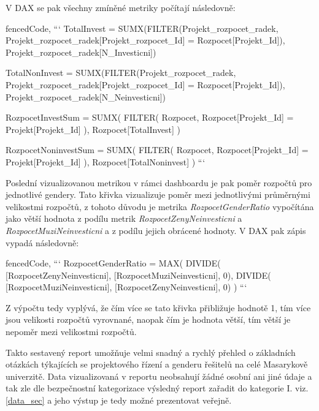 \documentclass[
  digital,     %
  twoside,     %
  lof,         %
  lot,         %
]{fithesis4}
\begin{document}
V DAX se pak všechny zmíněné metriky počítají následovně:
\begin{tcolorbox}
\begin{markdown*}{%
  fencedCode,
}
```
TotalInvest = 
    SUMX(FILTER(Projekt_rozpocet_radek,
         Projekt_rozpocet_radek[Projekt_rozpocet_Id] =
            Rozpocet[Projekt_Id]),
    Projekt_rozpocet_radek[N_Investicni])

TotalNonInvest = 
    SUMX(FILTER(Projekt_rozpocet_radek,
         Projekt_rozpocet_radek[Projekt_rozpocet_Id] =
            Rozpocet[Projekt_Id]),
    Projekt_rozpocet_radek[N_Neinvesticni])


RozpocetInvestSum = 
    SUMX(
        FILTER(
            Rozpocet,
            Rozpocet[Projekt_Id] = Projekt[Projekt_Id]
            ),
        Rozpocet[TotalInvest]
    )

RozpocetNoninvestSum = 
    SUMX(
        FILTER(
            Rozpocet,
            Rozpocet[Projekt_Id] = Projekt[Projekt_Id]
            ),
        Rozpocet[TotalNoninvest]
    )
```
\end{markdown*}
\end{tcolorbox}

Poslední vizualizovanou metrikou v rámci dashboardu je pak poměr rozpočtů pro jednotlivé gendery. Tato křivka vizualizuje poměr mezi jednotlivými průměrnými velikostmi rozpočtů, z tohoto důvodu  je metrika \emph{RozpocetGenderRatio} vypočítána jako větší hodnota z podílu metrik \emph{RozpocetZenyNeinvesticni} a \emph{RozpocetMuziNeinvesticni} a z podílu jejich obrácené hodnoty. V DAX pak zápis vypadá následovně: 

\begin{tcolorbox}
\begin{markdown*}{%
  fencedCode,
}
```
RozpocetGenderRatio = 
    MAX(
        DIVIDE(
            [RozpocetZenyNeinvesticni],
            [RozpocetMuziNeinvesticni], 0),
        DIVIDE(
            [RozpocetMuziNeinvesticni],
            [RozpocetZenyNeinvesticni], 0)
        )
```
\end{markdown*}
\end{tcolorbox}
Z výpočtu tedy vyplývá, že čím více se tato křivka přibližuje hodnotě 1, tím více  jsou velikosti rozpočtů vyrovnané, naopak čím je hodnota větší, tím větší je nepoměr mezi velikostmi rozpočtů.

\vspace{5mm}
Takto sestavený report umožňuje velmi snadný a rychlý přehled o základních otázkách týkajících se projektového řízení a genderu řešitelů na celé Masarykově univerzitě. 
Data vizualizovaná v reportu neobsahují žádné osobní ani jiné údaje a tak zle dle bezpečnostní kategorizace výsledný report zařadit do kategorie I. viz. \ref{data_sec} a jeho výstup je tedy možné prezentovat veřejně.
\end{document}
